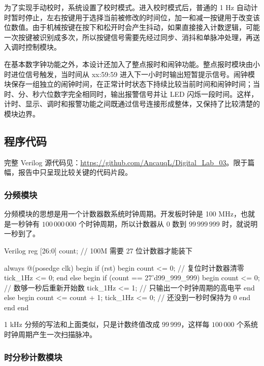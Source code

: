 \documentclass[12pt,a4paper,UTF8]{ctexart}
\begin{document}
为了实现手动校时，系统设置了校时模式。进入校时模式后，普通的 1 Hz 自动计时暂时停止，左右按键用于选择当前被修改的时间位，加一和减一按键用于改变该位数值。由于机械按键在按下和松开时会产生抖动，如果直接接入计数逻辑，可能一次按键被识别成多次，所以按键信号需要先经过同步、消抖和单脉冲处理，再送入调时控制模块。

在基本数字钟功能之外，本设计还加入了整点报时和闹钟功能。整点报时模块由小时进位信号触发，当时间从 xx:59:59 进入下一小时时输出短暂提示信号。闹钟模块保存一组独立的闹钟时间，在正常计时状态下持续比较当前时间和闹钟时间；当时、分、秒六位数字完全相同时，输出报警信号并让 LED 闪烁一段时间。这样，计时、显示、调时和报警功能之间既通过信号连接形成整体，又保持了比较清楚的模块边界。

\subsection{程序代码}

完整 Verilog 源代码见：\url{https://github.com/AncauqL/Digital_Lab_03}。限于篇幅，报告中只呈现比较关键的代码片段。

\subsubsection{分频模块}

分频模块的思想是用一个计数器数系统时钟周期。开发板时钟是 100 MHz，也就是一秒钟有 $100\,000\,000$ 个时钟周期，所以计数器从 0 数到 $99\,999\,999$ 时，就说明一秒到了。

\begin{codeblock}{Verilog}
reg [26:0] count; // 100M 需要 27 位计数器才能装下

always @(posedge clk) begin
    if (rst) begin
        count <= 0;       // 复位时计数器清零
        tick_1Hz <= 0;   
    end else begin
        if (count == 27'd99_999_999) begin
            count <= 0;       // 数够一秒后重新开始数
            tick_1Hz <= 1;    // 只输出一个时钟周期的高电平
        end else begin
            count <= count + 1;
            tick_1Hz <= 0;    // 还没到一秒时保持为 0
        end
    end
end
\end{codeblock}

1 kHz 分频的写法和上面类似，只是计数终值改成 $99\,999$，这样每 $100\,000$ 个系统时钟周期产生一次扫描脉冲。

\subsubsection{时分秒计数模块}
\end{document}
